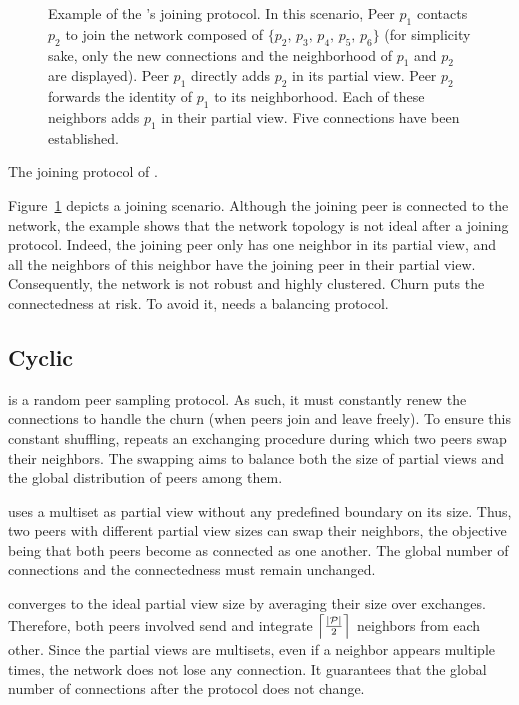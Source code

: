\begin{figure}
  \centering
  
  \caption{\label{fig:joiningexample}Example of the \SCAMPLON{}'s joining
    protocol. In this scenario, Peer $p_1$ contacts $p_2$ to join the network
    composed of $\{p_2,\,p_3,\,p_4,\,p_5,\,p_6\}$ (for simplicity sake, only
    the new connections and the neighborhood of $p_1$ and $p_2$ are
    displayed). Peer $p_1$ directly adds $p_2$ in its partial view. Peer $p_2$
    forwards the identity of $p_1$ to its neighborhood. Each of these
    neighbors adds $p_1$ in their partial view. Five connections have been
    established.}
\end{figure}

\begin{algorithm}

\caption{\label{algo:joiningalgo}The joining protocol of \SCAMPLON{}.}
\end{algorithm}

Figure~\ref{fig:joiningexample} depicts a joining scenario. Although the
joining peer is connected to the network, the example shows that the network
topology is not ideal after a joining protocol. Indeed, the joining peer only
has one neighbor in its partial view, and all the neighbors of this neighbor
have the joining peer in their partial view. Consequently, the network is not
robust and highly clustered. Churn puts the connectedness at risk. To avoid it,
\SCAMPLON{} needs a balancing protocol.

\subsection{Cyclic}

\SCAMPLON{} is a random peer sampling protocol. As such, it must constantly
renew the connections to handle the churn (when peers join and leave freely).
To ensure this constant shuffling, \SCAMPLON{} repeats an exchanging procedure
during which two peers swap their neighbors. The swapping aims to balance both
the size of partial views and the global distribution of peers among them.

\SCAMPLON{} uses a multiset as partial view without any predefined boundary on
its size. Thus, two peers with different partial view sizes can swap their
neighbors, the objective being that both peers become as connected as one
another. The global number of connections and the connectedness must remain
unchanged.

\SCAMPLON{} converges to the ideal partial view size by averaging their size
over exchanges. Therefore, both peers involved send and integrate
$\left\lceil|\mathcal{P}|\over{2}\right\rceil$ neighbors from each
other. Since the partial views are multisets, even if a neighbor appears
multiple times, the network does not lose any connection. It guarantees that
the global number of connections after the protocol does not change.

